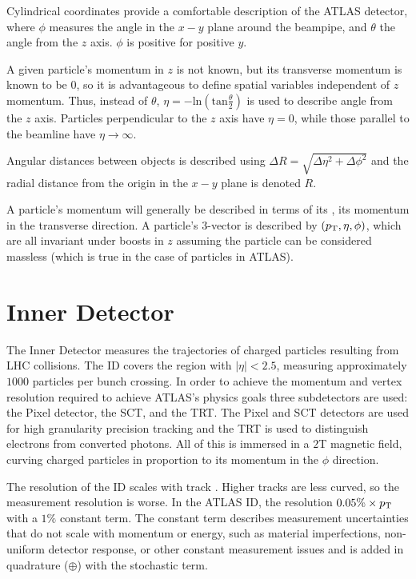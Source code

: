 Cylindrical coordinates provide a comfortable description of the \ac{ATLAS} detector, where $\phi$ measures the angle in the $x-y$ plane around the beampipe, and $\theta$ the angle from the $z$ axis. $\phi$ is positive for positive $y$. 

A given particle's momentum in $z$ is not known, but its transverse momentum is known to be $0$, so it is advantageous to define spatial variables independent of $z$ momentum. Thus, instead of $\theta$, $\eta = - \textrm{ln}(\textrm{tan}\frac{\theta}{2})$ is used to describe angle from the $z$ axis. Particles perpendicular to the $z$ axis have $\eta = 0$, while those parallel to the beamline have $\eta \rightarrow \infty$. 

Angular distances between objects is described using $\Delta R = \sqrt{\Delta \eta ^2 + \Delta \phi ^2}$ and the radial distance from the origin in the $x-y$ plane is denoted $R$. 

A particle's momentum will generally be described in terms of its \pT, its momentum in the transverse direction. A particle's $3$-vector is described by $(p_{\text{T}}, \eta, \phi)$, which are all invariant under boosts in $z$ assuming the particle can be considered massless (which is true in the case of particles in \ac{ATLAS}).





\section{Inner Detector}
The Inner Detector measures the trajectories of charged particles resulting from \ac{LHC} collisions. The \ac{ID} covers the region with $|\eta| < 2.5$, measuring approximately $1000$ particles per bunch crossing. In order to achieve the momentum and vertex resolution required to achieve \ac{ATLAS}'s physics goals three subdetectors are used: the Pixel detector, the \ac{SCT}, and the \ac{TRT}. The Pixel and \ac{SCT} detectors are used for high granularity precision tracking and the \ac{TRT} is used to distinguish electrons from converted photons. All of this is immersed in a $2$T magnetic field, curving charged particles in proportion to its momentum in the $\phi$ direction.



The \pt resolution of the \ac{ID} scales with track \pt. Higher \pt tracks are less curved, so the measurement resolution is worse. In the \ac{ATLAS} \ac{ID}, the \pt resolution  $0.05\% \times p_{\text{T}}$ with a $1\%$ constant term. The constant term describes measurement uncertainties that do not scale with momentum or energy, such as material imperfections, non-uniform detector response, or other constant measurement issues and is added in quadrature ($\oplus$) with the stochastic term.

